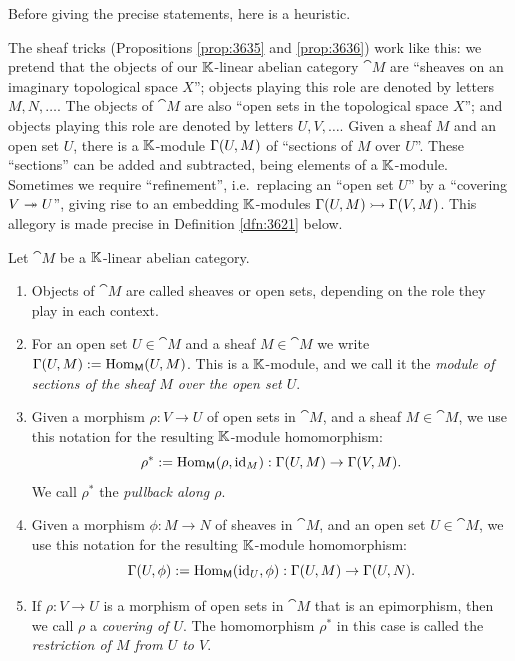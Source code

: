 Before giving the precise statements, here is a heuristic.%

\begin{rem} \label{rem:3655}
The sheaf tricks (Propositions \ref{prop:3635} and \ref{prop:3636}) work like 
this: we pretend that the objects of our $\mathbb{K}$-linear abelian 
category $\cat{M}$ are ``sheaves on an imaginary topological space $X$''; 
objects playing this role are denoted by letters $M, N, \ldots$. 
The objects of $\cat{M}$ are also ``open sets in the topological space $X$'';
and objects playing this role are denoted by letters $U, V, \ldots$.
Given a sheaf $M$ and an open set $U$, there is a $\mathbb{K}$-module 
$\Gamma(U, M)$ of ``sections of $M$ over $U$''. 
These ``sections'' can be added and subtracted, being elements of a 
$\mathbb{K}$-module. Sometimes we require ``refinement'', i.e.\ replacing an 
``open set $U$'' by a ``covering $V \twoheadrightarrow U$'', giving rise to an embedding 
$\mathbb{K}$-modules $\Gamma(U, M) \rightarrowtail \Gamma(V, M)$. This allegory is made precise in 
Definition \ref{dfn:3621} below. 
\end{rem}

\begin{dfn} \label{dfn:3621}
Let $\cat{M}$ be a $\mathbb{K}$-linear abelian category. 
\begin{enumerate}
\item Objects of $\cat{M}$ are called sheaves or open sets, depending on the 
role they play in each context. 

\item For an open set $U \in \cat{M}$ and a sheaf $M \in \cat{M}$ we write 
$\Ga(U, M) := \lb \opn{Hom}_{\cat{M}}(U, M)$.
This is a $\mathbb{K}$-module, and we call it the {\em module of sections of 
the sheaf $M$ over the open set $U$}.

\item Given a morphism $\rho: V \to U$ of open sets in $\cat{M}$, and a sheaf 
$M \in \cat{M}$, we use this notation for the resulting $\mathbb{K}$-module 
homomorphism:
\[ \rho^* := \operatorname{Hom}_{\operatorname{\mathsf{M}}}(\rho, \operatorname{id}_M) : 
\Gamma(U, M) \to \Gamma(V, M) . \]
We call $\rho^*$ the {\em pullback along $\rho$}.  


\item Given a morphism $\phi : M \to N$ of sheaves in $\cat{M}$, and an open 
set $U \in \cat{M}$, we use this notation for the resulting $\mathbb{K}$-module 
homomorphism:
\[ \Gamma(U, \phi) := \operatorname{Hom}_{\operatorname{\mathsf{M}}}(\operatorname{id}_U, \phi) : 
\Gamma(U, M) \to \Gamma(U, N) . \]

\item If $\rho : V \to U$ is a morphism of open sets in $\cat{M}$ that is an  
epimorphism, then we call $\rho$ a {\em covering of $U$}. The homomorphism 
$\rho^*$ in this case is called the {\em restriction of $M$ from $U$ to $V$}.   
\end{enumerate}   
\end{dfn}

